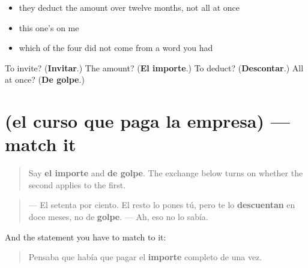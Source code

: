 \begin{itemize}
\raggedright
  \item they deduct the amount over twelve months, not all at once
  \item this one's on me
  \item which of the four did not come from a word you had
\end{itemize}

\begin{tcolorbox}[breakable,colback=teal!4,colframe=teal!35!black,title={Before you move on}]
To invite? (\textbf{Invitar}.) The amount? (\textbf{El importe}.) To deduct? (\textbf{Descontar}.) All at once? (\textbf{De golpe}.)
\end{tcolorbox}
\section[Practice]{(el curso que paga la empresa) — match it}

\label{lesson:ES-C474-sintesis-pago}



\begin{quote}
Say \textbf{el importe} and \textbf{de golpe}. The exchange below turns on whether the second applies to the first.
\end{quote}

\begin{tcolorbox}[breakable,skin=enhanced,colback=orange!6,colframe=orange!45!black,boxrule=0.5pt,arc=1mm,left=6pt,right=6pt,top=4pt,bottom=4pt,fonttitle=\bfseries,title={Read this}]
\begin{quote}
— El setenta por ciento. El resto lo pones tú, pero te lo \textbf{descuentan} en doce meses, no de \textbf{golpe}. — Ah, eso no lo sabía.
\end{quote}

And the statement you have to match to it:

\begin{quote}
Pensaba que había que pagar el \textbf{importe} completo de una vez.
\end{quote}
\end{tcolorbox}

